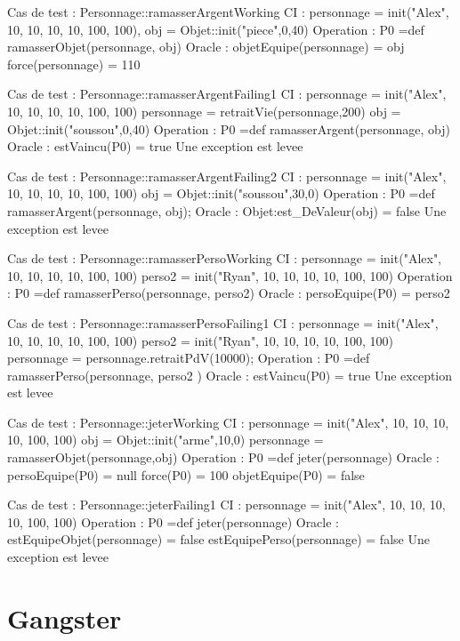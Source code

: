 \documentclass[a4paper, 11pt, notitlepage]{report}
\begin{document}
\begin{Test}
	
Cas de test : Personnage::ramasserArgentWorking
CI : personnage = init("Alex", 10, 10, 10, 10, 100, 100),
		 obj = Objet::init("piece",0,40)
Operation : P0 =def ramasserObjet(personnage, obj)
Oracle :
	objetEquipe(personnage) = obj
	force(personnage) = 110

Cas de test : Personnage::ramasserArgentFailing1
CI :	personnage = init("Alex", 10, 10, 10, 10, 100, 100)
			personnage = retraitVie(personnage,200)
			obj = Objet::init("soussou",0,40)
Operation : P0 =def ramasserArgent(personnage, obj)
Oracle : 
	estVaincu(P0) = true
	Une exception est levee
	
Cas de test : Personnage::ramasserArgentFailing2
CI :	personnage = init("Alex", 10, 10, 10, 10, 100, 100)
			obj = Objet::init("soussou",30,0)
Operation : P0 =def ramasserArgent(personnage, obj);
Oracle : 
	Objet:est_DeValeur(obj) = false
	Une exception est levee
	
Cas de test : Personnage::ramasserPersoWorking
CI : personnage = init("Alex", 10, 10, 10, 10, 100, 100)
			perso2 = init("Ryan", 10, 10, 10, 10, 100, 100)
Operation : P0 =def ramasserPerso(personnage, perso2)
Oracle :
	persoEquipe(P0) = perso2

Cas de test : Personnage::ramasserPersoFailing1
CI :	personnage = init("Alex", 10, 10, 10, 10, 100, 100)
			perso2 = init("Ryan", 10, 10, 10, 10, 100, 100)
			personnage = personnage.retraitPdV(10000);
Operation : P0 =def ramasserPerso(personnage, perso2 )
Oracle : 
	estVaincu(P0) = true
	Une exception est levee
	
	
Cas de test : Personnage::jeterWorking
CI : personnage = init("Alex", 10, 10, 10, 10, 100, 100)
			obj = Objet::init("arme",10,0)
			personnage = ramasserObjet(personnage,obj)
Operation : P0 =def jeter(personnage)
Oracle :
	persoEquipe(P0) = null
	force(P0) = 100
	objetEquipe(P0) = false

Cas de test : Personnage::jeterFailing1
CI :	personnage = init("Alex", 10, 10, 10, 10, 100, 100)
Operation : P0 =def jeter(personnage)
Oracle : 
	estEquipeObjet(personnage) = false
	estEquipePerso(personnage) = false
	Une exception est levee
	
\end{Test}
\newpage
\section{Gangster}
\begin{Test}

     
\end{Test}
 
\end{document}
